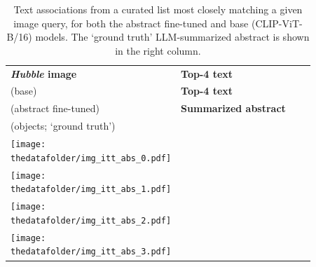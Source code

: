 \documentclass[10pt]{article} %
\newcommand{\hubble}{\emph{Hubble}\xspace}
\begin{document}
\begin{table}[h!]
  \centering
  \renewcommand{\arraystretch}{0.1}
  \begin{tabular}{m{3cm} m{3.2cm} m{3.2cm} m{5cm}}
      \toprule
      \centering \bfseries \hubble image & \centering \textbf{Top-4 text} \\ {\textcolor{deeppurple}{(base)}} & \centering  \textbf{Top-4 text} \\ {\textcolor{deepblue}{(abstract fine-tuned)}} & \centering \textbf{Summarized abstract} \\ (objects; `ground truth') \tabularnewline
      \midrule
      \centering \texttt{[image: \\thedatafolder/img\_itt\_abs\_0.pdf]} & \centering \scriptsize  & \centering  \scriptsize  &  {\scriptsize } \tabularnewline
      \midrule
      \centering \texttt{[image: \\thedatafolder/img\_itt\_abs\_1.pdf]} & \centering \scriptsize  & \centering  \scriptsize  &  {\scriptsize } \tabularnewline
      \midrule
      \centering \texttt{[image: \\thedatafolder/img\_itt\_abs\_2.pdf]} & \centering \scriptsize  & \centering  \scriptsize  &  {\scriptsize } \tabularnewline
      \midrule
      \centering \texttt{[image: \\thedatafolder/img\_itt\_abs\_3.pdf]} & \centering \scriptsize  & \centering  \scriptsize  &  {\scriptsize } \tabularnewline
      \bottomrule
  \end{tabular}
  \caption{Text associations from a curated list most closely matching a given image query, for both the \textcolor{deepblue}{abstract fine-tuned} and \textcolor{deeppurple}{base} (CLIP-ViT-B/16) models. The `ground truth' LLM-summarized abstract is shown in the right column.}
  \label{tab:itt_abs}
\end{table}
  
\end{document}
